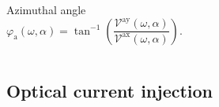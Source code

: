 \documentclass{beamer}
\begin{document}
\begin{frame}
{\begin{columns}
\begin{itemize}
\vspace{-2mm}
Azimuthal angle
\vspace{-3mm}
\begin{equation}
\varphi_{\mathrm{a}} (\omega,\alpha) =
\tan^{-1} \left( \frac{\mathcal{V}^{\mathrm{ay}}(\omega,\alpha)}
{\mathcal{V}^{\mathrm{ax}}(\omega,\alpha)} \right).
\label{eq:azimuthal-ang} 
\end{equation} 

\end{itemize}
\end{columns}

}

\end{frame}



\subsection{Optical current injection}
\end{document}
